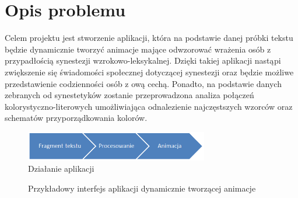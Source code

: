 \documentclass[12pt]{article}
\begin{document}
\section{Opis problemu}
	Celem projektu jest stworzenie aplikacji, która na podstawie danej próbki tekstu będzie dynamicznie tworzyć animacje mające odwzorować wrażenia osób z przypadłością synestezji wzrokowo-leksykalnej. Dzięki takiej aplikacji nastąpi zwiększenie się świadomości społecznej dotyczącej synestezji oraz będzie możliwe przedstawienie codzienności osób z ową cechą. Ponadto, na podstawie danych zebranych od synestetyków zostanie przeprowadzona analiza połączeń kolorystyczno-literowych umożliwiająca odnalezienie najczęstszych wzorców oraz schematów przyporządkowania kolorów.
\begin{figure}[ht!]
	\centering
	\includegraphics[width=8cm]{Capture.PNG}
	\caption{Działanie aplikacji}
\end{figure} 
\begin{figure}[ht!]
	\centering
	\caption{Przykładowy interfejs aplikacji dynamicznie tworzącej animacje}
\end{figure}
\end{document}
